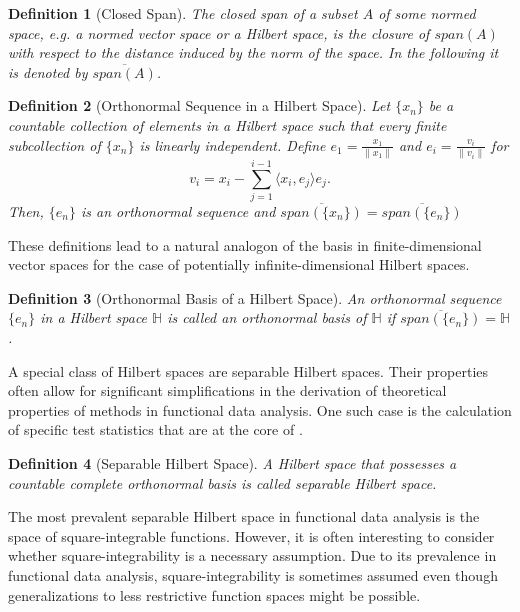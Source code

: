 \documentclass[12pt, a4paper]{article}
\theoremstyle{MAstyle} \newtheorem{assumption}{Assumption}[section]
\theoremstyle{MAstyle} \newtheorem{definition}{Definition}[section]
\theoremstyle{MAstyle} \newtheorem{theorem}{Theorem}[section]
\begin{document}
			\begin{definition}[Closed Span]
				The closed span of a subset $A$ of some normed space, e.g. a normed vector space or a Hilbert space, is the closure of $\textit{span}\left(A\right)$ with respect to the distance induced by the norm of the space. In the following it is denoted by $\overline{{\textit{span}\left(A\right)}}$.
			\end{definition}
		
			\begin{definition}[Orthonormal Sequence in a Hilbert Space]
				Let $\{x_n\}$ be a countable collection of elements in a Hilbert space such that every finite subcollection of $\{x_n\}$ is linearly independent. Define $e_1 = \frac{x_1}{\| x_1 \|}$ and $e_i = \frac{v_i}{\| v_i \|}$ for 
				$$v_i = x_i - \sum_{j = 1}^{i - 1}\langle x_i, e_j\rangle e_j.$$
				Then, $\{e_n\}$ is an orthonormal sequence and $\overline{{\textit{span}\left(\{x_n\}\right)}} = \overline{{\textit{span}\left(\{e_n\}\right)}}$
			\end{definition}
			These definitions lead to a natural analogon of the basis in finite-dimensional vector spaces for the case of potentially infinite-dimensional Hilbert spaces.
			\begin{definition}[Orthonormal Basis of a Hilbert Space]
				An orthonormal sequence $\{e_n\}$ in a Hilbert space $\mathbb{H}$ is called an orthonormal basis of $\mathbb{H}$ if $\overline{{\textit{span}\left(\{e_n\}\right)}} = \mathbb{H}$. 
			\end{definition}
			
			A special class of Hilbert spaces are separable Hilbert spaces. Their properties often allow for significant simplifications in the derivation of theoretical properties of methods in functional data analysis. One such case is the calculation of specific test statistics that are at the core of \cite{bugni_permutation_2021}.
			\begin{definition}[Separable Hilbert Space]
				A Hilbert space that possesses a countable complete orthonormal basis is called separable Hilbert space.
			\end{definition}
			
			The most prevalent separable Hilbert space in functional data analysis is the space of square-integrable functions. However, it is often interesting to consider whether square-integrability is a necessary assumption. Due to its prevalence in functional data analysis, square-integrability is sometimes assumed even though generalizations to less restrictive function spaces might be possible.
			
\end{document}
